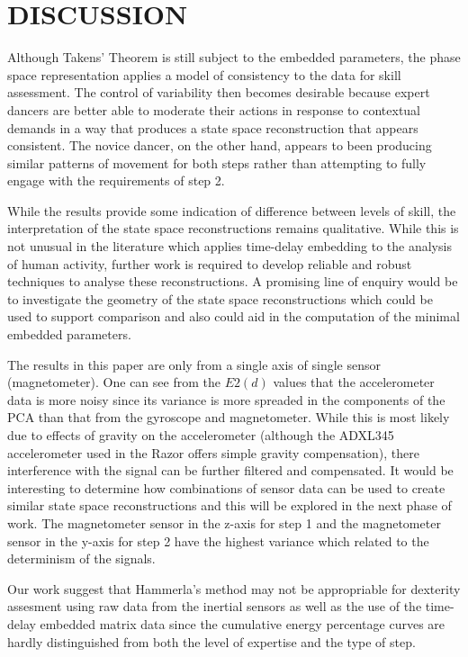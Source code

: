 \documentclass{sigchi}
\begin{document}
\section{DISCUSSION}
Although Takens' Theorem is still subject to the embedded parameters, 
the phase space representation applies a model of consistency to the data for skill assessment. 
The control of variability then becomes desirable because expert dancers are better able to moderate 
their actions in response to contextual demands in a way that produces a state space reconstruction 
that appears consistent.  The novice dancer, on the other hand, appears to been producing similar 
patterns of movement for both steps rather than attempting to fully engage with the requirements of step 2.  


While the results provide some indication of difference between levels of skill, the interpretation of 
the state space reconstructions remains qualitative.  While this is not unusual in the literature
which applies time-delay embedding to the analysis of human activity, further work is required to develop 
reliable and robust techniques to analyse these reconstructions.  
A promising line of enquiry would be to investigate the geometry of the state space reconstructions
which could be used to support comparison \cite{Sama2013} and also could aid in the computation of the minimal 
embedded parameters. 
 
The results in this paper are only from a single axis of single sensor (magnetometer). 
One can see from the $E2(d)$ values that the accelerometer data is more noisy since its variance is 
more spreaded in the components of the PCA than that from the gyroscope and magnetometer.  
While this is most likely due to effects of gravity on the accelerometer 
(although the ADXL345 accelerometer used in the Razor offers simple gravity compensation), 
there interference with the signal can be further filtered and compensated.  
It would be interesting to determine how combinations of sensor data can be used to create similar 
state space reconstructions and this will be explored in the next phase of work. 
The magnetometer sensor in the z-axis for step 1 and the magnetometer sensor in the y-axis for step 2
have the highest variance which related to the determinism of the signals.

Our work suggest that Hammerla's method may not be appropriable for dexterity assesment using 
raw data from the inertial sensors as well as the use of the time-delay embedded matrix data
since the cumulative energy percentage curves are hardly distinguished from 
both the level of expertise and the type of step.
\end{document}
